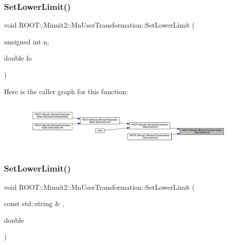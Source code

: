 \mbox{\label{classROOT_1_1Minuit2_1_1MnUserTransformation_a380498bdd8801393713fde4a4835402e}} 
\subsubsection{\texorpdfstring{SetLowerLimit()}{SetLowerLimit()}\hspace{0.1cm}{\footnotesize\ttfamily [2/4]}}
{\footnotesize\ttfamily void R\+O\+O\+T\+::\+Minuit2\+::\+Mn\+User\+Transformation\+::\+Set\+Lower\+Limit (\begin{DoxyParamCaption}\item[{unsigned int}]{n,  }\item[{double}]{lo }\end{DoxyParamCaption})}

Here is the caller graph for this function\+:\nopagebreak
\begin{figure}[H]
\begin{center}
\leavevmode
\includegraphics[width=350pt]{d9/d98/classROOT_1_1Minuit2_1_1MnUserTransformation_a380498bdd8801393713fde4a4835402e_icgraph}
\end{center}
\end{figure}
\mbox{\label{classROOT_1_1Minuit2_1_1MnUserTransformation_aebc0f6d54f3ae5d58b86435529c16796}} 
\subsubsection{\texorpdfstring{SetLowerLimit()}{SetLowerLimit()}\hspace{0.1cm}{\footnotesize\ttfamily [3/4]}}
{\footnotesize\ttfamily void R\+O\+O\+T\+::\+Minuit2\+::\+Mn\+User\+Transformation\+::\+Set\+Lower\+Limit (\begin{DoxyParamCaption}\item[{const std\+::string \&}]{,  }\item[{double}]{ }\end{DoxyParamCaption})}

